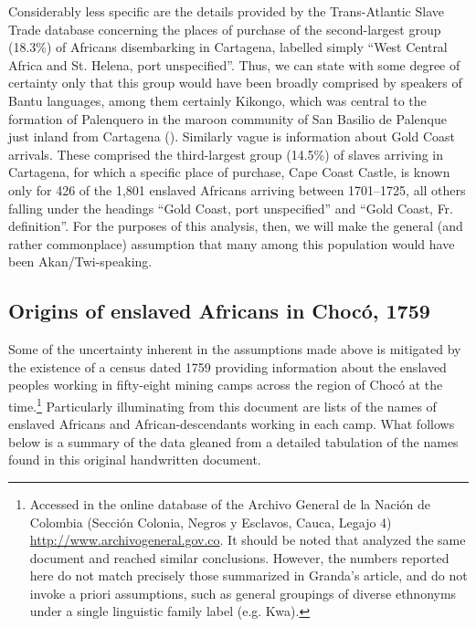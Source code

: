 \documentclass[output=paper,colorlinks,citecolor=brown]{langscibook}
\begin{document}
Considerably less specific are the details provided by the Trans-Atlantic Slave Trade database concerning the places of purchase of the second-largest group (18.3\%) of Africans disembarking in Cartagena, labelled simply “West Central Africa and St. Helena, port unspecified”. Thus, we can state with some degree of certainty only that this group would have been broadly comprised by speakers of Bantu languages, among them certainly Kikongo, which was central to the formation of Palenquero in the maroon community of San Basilio de Palenque just inland from Cartagena (\cite{Schwegler_2002,Schwegler_2011}). Similarly vague is information about Gold Coast arrivals. These comprised the third-largest group (14.5\%) of slaves arriving in Cartagena, for which a specific place of purchase, Cape Coast Castle, is known only for 426 of the 1,801 enslaved Africans arriving between 1701--1725, all others falling under the headings “Gold Coast, port unspecified” and “Gold Coast, Fr. definition”. For the purposes of this analysis, then, we will make the general (and rather commonplace) assumption that many among this population would have been Akan/Twi-speaking.


\subsection{Origins of enslaved Africans in Chocó, 1759}

Some of the uncertainty inherent in the assumptions made above is mitigated by the existence of a census dated 1759 providing information about the enslaved peoples working in fifty-eight mining camps across the region of Chocó at the time.\footnote{Accessed in the online database of the Archivo General de la Nación de Colombia (Sección Colonia, Negros y Esclavos, Cauca, Legajo 4) \url{http://www.archivogeneral.gov.co}. It should be noted that \citet{Granda_1988} analyzed the same document and reached similar conclusions. However, the numbers reported here do not match precisely those summarized in Granda’s article, and do not invoke a priori assumptions, such as general groupings of diverse ethnonyms under a single linguistic family label (e.g. Kwa).} Particularly illuminating from this document are lists of the names of enslaved Africans and African-descendants working in each camp. What follows below is a summary of the data gleaned from a detailed tabulation of the names found in this original handwritten document. 
\end{document}
